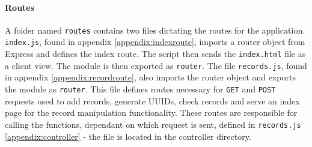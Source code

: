 \paragraph{Routes}
A folder named \lstinline{routes} contains two files dictating the routes for the application. 
\lstinline{index.js}, found in appendix \ref{appendix:indexroute}, imports a router object from Express and defines the index route. 
The script then sends the \lstinline{index.html} file as a client view.
The module is then exported as \lstinline{router}. 
The file \lstinline{records.js}, found in appendix \ref{appendix:recordroute}, also imports the router object and exports the module as \lstinline{router}. 
This file defines routes necessary for \lstinline{GET} and \lstinline{POST} requests used to add records, generate UUIDs, check records and serve an index page for the record manipulation functionality. 
These routes are responsible for calling the functions, dependant on which request is sent, defined in \lstinline{records.js} \ref{appendix:controller} - the file is located in the controller directory. 

